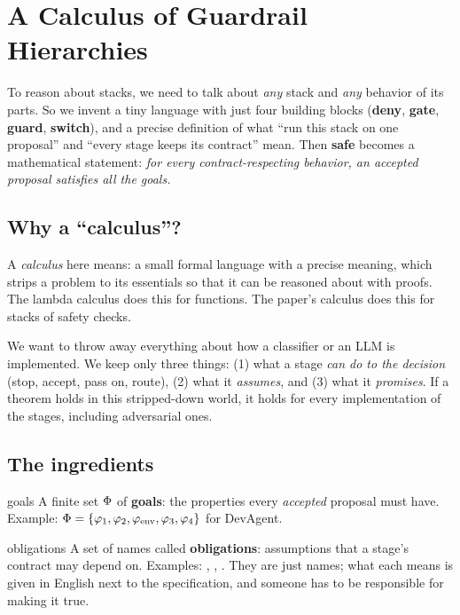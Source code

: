 \section{A Calculus of Guardrail Hierarchies}
\label{ch:calculus}

\begin{bigidea}
To reason about stacks, we need to talk about \emph{any} stack and \emph{any} behavior of its parts. So we invent a tiny language with just four building blocks (\textbf{deny}, \textbf{gate}, \textbf{guard}, \textbf{switch}), and a precise definition of what ``run this stack on one proposal'' and ``every stage keeps its contract'' mean. Then \textbf{safe} becomes a mathematical statement: \emph{for every contract-respecting behavior, an accepted proposal satisfies all the goals.}
\end{bigidea}

\subsection{Why a ``calculus''?}

A \emph{calculus} here means: a small formal language with a precise meaning, which strips a problem to its essentials so that it can be reasoned about with proofs. The lambda calculus does this for functions. The paper's calculus does this for stacks of safety checks.

We want to throw away everything about how a classifier or an LLM is implemented. We keep only three things: (1) what a stage \emph{can do to the decision} (stop, accept, pass on, route), (2) what it \emph{assumes}, and (3) what it \emph{promises}. If a theorem holds in this stripped-down world, it holds for every implementation of the stages, including adversarial ones.

\subsection{The ingredients}

\begin{defbox}{goals}
A finite set $\Phi$ of \textbf{goals}: the properties every \emph{accepted} proposal must have. Example: $\Phi=\{\varphi_1,\varphi_2,\varphi_{\mathrm{env}},\varphi_3,\varphi_4\}$ for DevAgent.
\end{defbox}

\begin{defbox}{obligations}
A set of names called \textbf{obligations}: assumptions that a stage's contract may depend on. Examples: , , . They are just names; what each means is given in English next to the specification, and someone has to be responsible for making it true.
\end{defbox}

